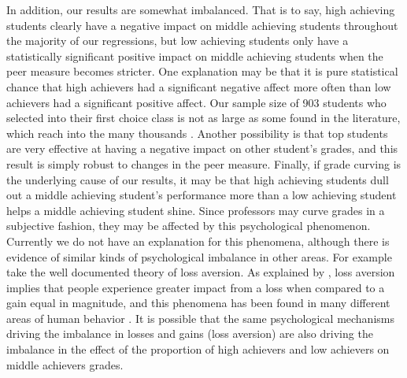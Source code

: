 In addition, our results are somewhat imbalanced. That is to say, high achieving students clearly have a negative impact on middle achieving students throughout the majority of our regressions, but low achieving students only have a statistically significant positive impact on middle achieving students when the peer measure becomes stricter. 
One explanation may be that it is pure statistical chance that high achievers had a significant negative affect more often than low achievers had a significant positive affect. 
Our sample size of 903 students who selected into their first choice class is not as large as some found in the literature, which reach into the many thousands \citep{kang2007classroom,lavy2012good}. 
Another possibility is that top students are very effective at having a negative impact on other student's grades, and this result is simply robust to changes in the peer measure. 
Finally, if grade curving is the underlying cause of our results, it may be that high achieving students dull out a middle achieving student's performance more than a low achieving student helps a middle achieving student shine.
Since professors may curve grades in a subjective fashion, they may be affected by this psychological phenomenon. 
Currently we do not have an explanation for this phenomena, although there is evidence of similar kinds of psychological imbalance in other areas. 
For example take the well documented theory of loss aversion. 
As explained by \citet{tversky1991loss}, loss aversion implies that people experience greater impact from a loss when compared to a gain equal in magnitude, and this phenomena has been found in many different areas of human behavior \citep{shalev2002loss,goette2004loss}. 
It is possible that the same psychological mechanisms driving the imbalance in losses and gains (loss aversion) are also driving the imbalance in the effect of the proportion of high achievers and low achievers on middle achievers grades. 

